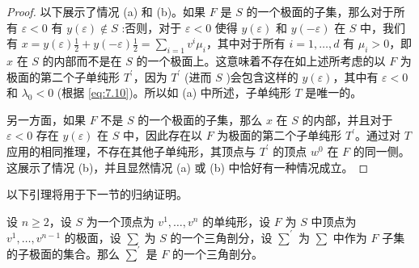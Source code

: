 \begin{proof}
以下展示了情况 (a) 和 (b)。如果 \(F\) 是 \(S\) 的一个极面的子集，那么对于所有 \(\varepsilon  < 0\) 有 \(y\left( \varepsilon \right)  \notin  S\) :否则，对于 \(\varepsilon  < 0\) 使得 \(y\left( \varepsilon \right)\) 和 \(y\left( {-\varepsilon }\right)\) 在 \(S\) 中，我们有 \(x = y\left( \varepsilon \right) \frac{1}{2} + y\left( {-\varepsilon }\right) \frac{1}{2} = \mathop{\sum }\limits_{{i = 1}}{v}^{i}{\mu }_{i}\)，其中对于所有 \(i = 1,\ldots,d\) 有 \({\mu }_{i} > 0\)，即 \(x\) 在 \(S\) 的内部而不是在 \(S\) 的一个极面上。这意味着不存在如上述所考虑的以 \(F\) 为极面的第二个子单纯形 \({T}^{\prime }\)，因为 \({T}^{\prime }\) (进而 \(S\) )会包含这样的 \(y\left( \varepsilon \right)\)，其中有 \(\varepsilon  < 0\) 和 \({\lambda }_{0} < 0\) (根据 \eqref{eq:7.10})。所以如 (a) 中所述，子单纯形 \(T\) 是唯一的。

另一方面，如果 \(F\) 不是 \(S\) 的一个极面的子集，那么 \(x\) 在 \(S\) 的内部，并且对于 \(\varepsilon  < 0\) 存在 \(y\left( \varepsilon \right)\) 在 \(S\) 中，因此存在以 \(F\) 为极面的第二个子单纯形 \({T}^{\prime }\)。通过对 \(T\) 应用的相同推理，不存在其他子单纯形，其顶点与 \({T}^{\prime }\) 的顶点 \({w}^{0}\) 在 \(F\) 的同一侧。这展示了情况 (b)，并且显然情况 (a) 或 (b) 中恰好有一种情况成立。
\end{proof}

以下引理将用于下一节的归纳证明。

\begin{lemma}\label{lem:7.7}
设 \(n \geq  2\)，设 \(S\) 为一个顶点为 \({v}^{1},\ldots,{v}^{n}\) 的单纯形，设 \(F\) 为 \(S\) 中顶点为 \({v}^{1},\ldots,{v}^{n - 1}\) 的极面，设 \(\sum\) 为 \(S\) 的一个三角剖分，设 \({\sum }^{\prime }\) 为 \(\sum\) 中作为 \(F\) 子集的子极面的集合。那么 \({\sum }^{\prime }\) 是 \(F\) 的一个三角剖分。
\end{lemma}


